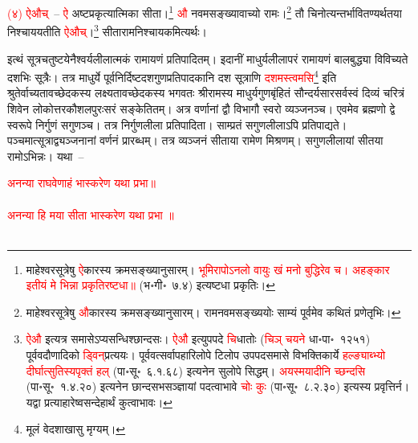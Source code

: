 \begin{sloppypar}\justifying\noindent\hspace{10mm} \textcolor{red}{(४) ऐऔच्}~– \textcolor{red}{ऐ} अष्टप्रकृत्यात्मिका सीता।\footnote{माहेश्वर\-सूत्रेषु \textcolor{red}{ऐ}\-कारस्य क्रमसङ्ख्यानुसारम्। \textcolor{red}{भूमिरापोऽनलो वायुः खं मनो बुद्धिरेव च। अहङ्कार इतीयं मे भिन्ना प्रकृतिरष्टधा॥} (भ॰गी॰~७.४) इत्यष्टधा प्रकृतिः।} \textcolor{red}{औ} नवम\-सङ्ख्या\-वाच्यो रामः।\footnote{माहेश्वर\-सूत्रेषु \textcolor{red}{औ}\-कारस्य क्रमसङ्ख्यानुसारम्। राम\-नवमसङ्ख्ययोः साम्यं पूर्वमेव कथितं प्रणेतृभिः।} तौ चिनोत्यन्तर्भावित\-ण्यर्थतया निश्चाययतीति \textcolor{red}{ऐऔच्}।\footnote{\textcolor{red}{ऐऔ} इत्यत्र समासेऽप्यसन्धिश्छान्दसः। \textcolor{red}{ऐऔ} इत्युपपदे \textcolor{red}{चि}\-धातोः (\textcolor{red}{चिञ् चयने} धा॰पा॰~१२५१) पूर्ववदौणादिको \textcolor{red}{ड्विन्‌}प्रत्ययः। पूर्ववत्सर्वापहारि\-लोपे टिलोप उपपद\-समासे विभक्तिकार्ये \textcolor{red}{हल्ङ्याब्भ्यो दीर्घात्सुतिस्यपृक्तं हल्} (पा॰सू॰~६.१.६८) इत्यनेन सुलोपे सिद्धम्। \textcolor{red}{अयस्मयादीनि च्छन्दसि} (पा॰सू॰~१.४.२०) इत्यनेन छान्दस\-भसञ्ज्ञायां पदत्वाभावे \textcolor{red}{चोः कुः} (पा॰सू॰~८.२.३०) इत्यस्य प्रवृत्तिर्न। यद्वा प्रत्याहारेष्वसन्देहार्थं कुत्वाभावः।} सीता\-राम\-निश्चायकमित्यर्थः।\end{sloppypar}
\begin{sloppypar}\justifying\noindent\hspace{10mm} इत्थं सूत्र\-चतुष्टयेनैश्वर्य\-लीलात्मकं रामायणं प्रतिपादितम्। इदानीं माधुर्य\-लीला\-परं रामायणं बाल\-बुद्ध्या विविच्यते दशभिः सूत्रैः। तत्र माधुर्ये पूर्व\-निर्दिष्ट\-दश\-गुण\-प्रतिपादकानि दश सूत्राणि \textcolor{red}{दशमस्त्वमसि}\footnote{मूलं वेदशाखासु मृग्यम्।} इति श्रुतेर्वाच्यतावच्छेदकस्य लक्ष्यतावच्छेदकस्य भगवतः श्रीरामस्य माधुर्य\-गुण\-बृंहितं सौन्दर्य\-सार\-सर्वस्वं दिव्यं चरित्रं शिवेन लोकोत्तर\-कौशल\-पुरःसरं सङ्केतितम्। अत्र वर्णानां द्वौ विभागौ स्वरो व्यञ्जनञ्च। एवमेव ब्रह्मणो द्वे स्वरूपे निर्गुणं सगुणञ्च। तत्र निर्गुण\-लीला प्रतिपादिता। साम्प्रतं सगुण\-लीलाऽपि प्रतिपाद्यते। पञ्चमात्सूत्राद्व्यञ्जनानां वर्णनं प्रारब्धम्। तत्र व्यञ्जनं सीताया रामेण मिश्रणम्। सगुण\-लीलायां सीतया रामोऽभिन्नः। यथा~–\end{sloppypar}
\centering\textcolor{red}{अनन्या राघवेणाहं भास्करेण यथा प्रभा॥}\nopagebreak\\
\\
\centering\textcolor{red}{अनन्या हि मया सीता भास्करेण यथा प्रभा ॥}\nopagebreak\\
\\
